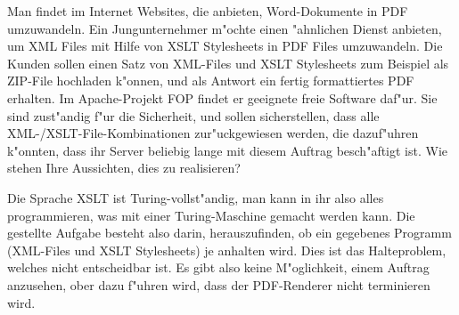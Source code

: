 Man findet im Internet Websites, die anbieten, Word-Dokumente in PDF
umzuwandeln.
Ein Jungunternehmer m"ochte einen "ahnlichen Dienst anbieten, um XML Files
mit Hilfe von XSLT Stylesheets in PDF Files umzuwandeln.
Die Kunden sollen einen Satz von XML-Files und XSLT Stylesheets zum
Beispiel als ZIP-File hochladen k"onnen, und als Antwort ein fertig
formattiertes PDF erhalten.
Im Apache-Projekt FOP findet er geeignete freie Software daf"ur.
Sie sind zust"andig f"ur die Sicherheit, und sollen sicherstellen, dass
alle XML-/XSLT-File-Kombinationen zur"uckgewiesen werden, die dazuf"uhren
k"onnten, dass ihr Server beliebig lange mit diesem Auftrag besch"aftigt
ist. Wie stehen Ihre Aussichten, dies zu realisieren?

\begin{loesung}
Die Sprache XSLT ist Turing-vollst"andig, man kann in ihr also alles
programmieren, was mit einer Turing-Maschine gemacht werden kann.
Die gestellte Aufgabe besteht also darin, herauszufinden, ob ein
gegebenes Programm (XML-Files und XSLT Stylesheets) je anhalten wird.
Dies ist das Halteproblem, welches nicht entscheidbar ist.
Es gibt also keine M"oglichkeit, einem Auftrag anzusehen, ober dazu
f"uhren wird, dass der PDF-Renderer nicht terminieren wird.
\end{loesung}

